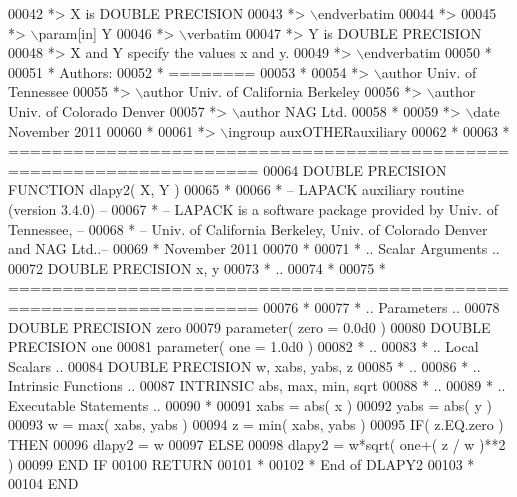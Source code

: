 \begin{DoxyCode}
00042 \textcolor{comment}{*>          X is DOUBLE PRECISION}
00043 \textcolor{comment}{*> \(\backslash\)endverbatim}
00044 \textcolor{comment}{*>}
00045 \textcolor{comment}{*> \(\backslash\)param[in] Y}
00046 \textcolor{comment}{*> \(\backslash\)verbatim}
00047 \textcolor{comment}{*>          Y is DOUBLE PRECISION}
00048 \textcolor{comment}{*>          X and Y specify the values x and y.}
00049 \textcolor{comment}{*> \(\backslash\)endverbatim}
00050 \textcolor{comment}{*}
00051 \textcolor{comment}{*  Authors:}
00052 \textcolor{comment}{*  ========}
00053 \textcolor{comment}{*}
00054 \textcolor{comment}{*> \(\backslash\)author Univ. of Tennessee }
00055 \textcolor{comment}{*> \(\backslash\)author Univ. of California Berkeley }
00056 \textcolor{comment}{*> \(\backslash\)author Univ. of Colorado Denver }
00057 \textcolor{comment}{*> \(\backslash\)author NAG Ltd. }
00058 \textcolor{comment}{*}
00059 \textcolor{comment}{*> \(\backslash\)date November 2011}
00060 \textcolor{comment}{*}
00061 \textcolor{comment}{*> \(\backslash\)ingroup auxOTHERauxiliary}
00062 \textcolor{comment}{*}
00063 \textcolor{comment}{*  =====================================================================}
00064 \textcolor{keyword}{      DOUBLE PRECISION }\textcolor{keyword}{FUNCTION }dlapy2( X, Y )
00065 \textcolor{comment}{*}
00066 \textcolor{comment}{*  -- LAPACK auxiliary routine (version 3.4.0) --}
00067 \textcolor{comment}{*  -- LAPACK is a software package provided by Univ. of Tennessee,    --}
00068 \textcolor{comment}{*  -- Univ. of California Berkeley, Univ. of Colorado Denver and NAG Ltd..--}
00069 \textcolor{comment}{*     November 2011}
00070 \textcolor{comment}{*}
00071 \textcolor{comment}{*     .. Scalar Arguments ..}
00072       \textcolor{keywordtype}{DOUBLE PRECISION}   x, y
00073 \textcolor{comment}{*     ..}
00074 \textcolor{comment}{*}
00075 \textcolor{comment}{*  =====================================================================}
00076 \textcolor{comment}{*}
00077 \textcolor{comment}{*     .. Parameters ..}
00078       \textcolor{keywordtype}{DOUBLE PRECISION}   zero
00079       parameter( zero = 0.0d0 )
00080       \textcolor{keywordtype}{DOUBLE PRECISION}   one
00081       parameter( one = 1.0d0 )
00082 \textcolor{comment}{*     ..}
00083 \textcolor{comment}{*     .. Local Scalars ..}
00084       \textcolor{keywordtype}{DOUBLE PRECISION}   w, xabs, yabs, z
00085 \textcolor{comment}{*     ..}
00086 \textcolor{comment}{*     .. Intrinsic Functions ..}
00087       \textcolor{keywordtype}{INTRINSIC}          abs, max, min, sqrt
00088 \textcolor{comment}{*     ..}
00089 \textcolor{comment}{*     .. Executable Statements ..}
00090 \textcolor{comment}{*}
00091       xabs = abs( x )
00092       yabs = abs( y )
00093       w = max( xabs, yabs )
00094       z = min( xabs, yabs )
00095       \textcolor{keywordflow}{IF}( z.EQ.zero ) \textcolor{keywordflow}{THEN}
00096          dlapy2 = w
00097       \textcolor{keywordflow}{ELSE}
00098          dlapy2 = w*sqrt( one+( z / w )**2 )
00099 \textcolor{keywordflow}{      END IF}
00100       \textcolor{keywordflow}{RETURN}
00101 \textcolor{comment}{*}
00102 \textcolor{comment}{*     End of DLAPY2}
00103 \textcolor{comment}{*}
00104 \textcolor{keyword}{      END}
\end{DoxyCode}
